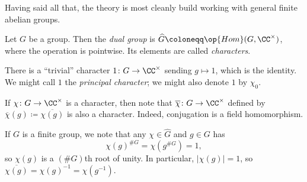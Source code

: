 \documentclass[../notes.tex]{subfiles}
\begin{document}
Having said all that, the theory is most cleanly build working with general finite abelian groups.
\begin{definition} 
	Let $G$ be a group. Then the \textit{dual group} is $\widehat{G}\coloneqq\op{Hom}(G,\CC^\times)$, where the operation is pointwise. Its elements are called \textit{characters}. 
\end{definition}
\begin{notation}
	There is a ``trivial'' character $1\colon G\to\CC^\times$ sending $g\mapsto1$, which is the identity. We might call $1$ the \textit{principal character}; we might also denote $1$ by $\chi_0$.
\end{notation}
\begin{notation}
	If $\chi\colon G\to\CC^\times$ is a character, then note that $\overline\chi\colon G\to\CC^\times$ defined by $\overline\chi(g)\coloneqq\overline{\chi(g)}$ is also a character. Indeed, conjugation is a field homomorphism.
\end{notation}
\begin{remark} \label{rem:chars-to-s1}
	If $G$ is a finite group, we note that any $\chi\in \widehat{G}$ and $g\in G$ has
	\[\chi(g)^{\#G}=\chi\left(g^{\#G}\right)=1,\]
	so $\chi(g)$ is a $(\#G)$th root of unity. In particular, $|\chi(g)|=1$, so $\overline{\chi(g)}=\chi(g)^{-1}=\chi\left(g^{-1}\right)$.
\end{remark}
\end{document}
